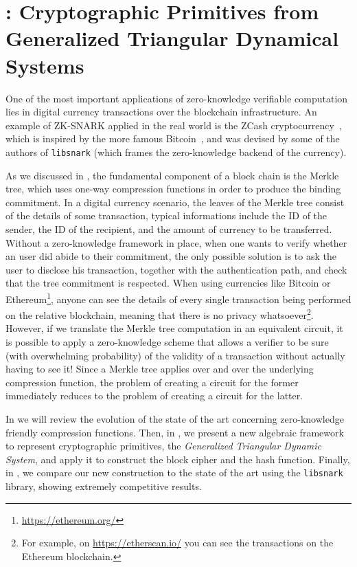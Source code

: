\chapter{\Arion: Cryptographic Primitives from Generalized Triangular Dynamical Systems}\label{chap:arion}
One of the most important applications of zero-knowledge verifiable computation lies in digital 
currency transactions over the blockchain infrastructure.
An example of ZK-SNARK applied in the real world is the ZCash cryptocurrency~\cite{SassonCGGMTV2014}, 
which is inspired by the more famous Bitcoin~\cite{NarayananBFMG2016}, and was devised by some of 
the authors of \texttt{libsnark} (which frames the zero-knowledge backend of the currency).

As we discussed in , the fundamental component of a block chain is the 
Merkle tree, which uses one-way compression functions in order to produce the binding 
commitment.
In a digital currency scenario, the leaves of the Merkle tree consist of the details of some 
transaction, typical informations include the ID of the sender, the ID of the recipient, and the 
amount of currency to be transferred. 
Without a zero-knowledge framework in place, when one wants to verify whether an user did abide to 
their commitment, the only possible solution is to ask the user to disclose his transaction, 
together with the authentication path, and check that the tree commitment is respected. 
When using currencies like Bitcoin or Ethereum\footnote{\url{https://ethereum.org/}}, anyone 
can see the details of every single transaction being performed on the relative 
blockchain, meaning that there is no privacy whatsoever\footnote{For example, on 
\url{https://etherscan.io/} you can see the transactions on the Ethereum blockchain. %
}.
However, if we translate the Merkle tree computation in an equivalent circuit, it is possible to 
apply a zero-knowledge scheme that allows a verifier to be sure (with overwhelming probability) 
of the validity of a transaction without actually having to see it!
Since a Merkle tree applies over and over the underlying compression function, the problem of 
creating a circuit for the former immediately reduces to the problem of creating a circuit for the 
latter.

In  we will review the evolution of the state of the art concerning zero-knowledge 
friendly compression functions.
Then, in , we present a new algebraic framework to represent cryptographic 
primitives, the \emph{Generalized Triangular Dynamic System}, and apply it to construct the 
\Arion{} block cipher and the \Arionhash{} hash function.
Finally, in , we compare our new construction to the state of the art using 
the \texttt{libsnark} library, showing extremely competitive results.



